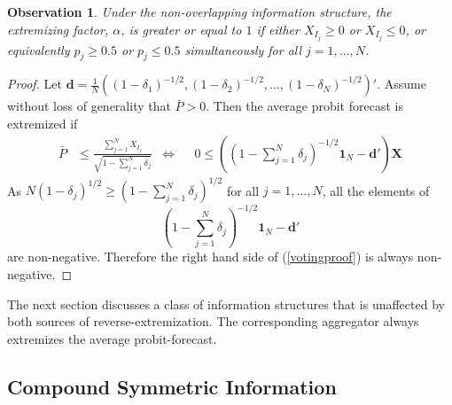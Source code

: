 \documentclass[11pt,twoside]{article}
\newtheorem{observation}[theorem]{Observation}
\theoremstyle{definition}
\theoremstyle{definition}
\begin{document}
\begin{observation}
\label{positiveThmVote}
Under the non-overlapping information structure, the extremizing factor, $\alpha$, is greater or equal to $1$ if either $X_{I_j} \geq 0$ or  $X_{I_j} \leq 0$, or equivalently $p_j \geq 0.5$ or $p_j \leq 0.5$ simultaneously for all $j = 1, \dots, N$. 
\end{observation}
\begin{proof} 
Let $\boldsymbol{d} = \frac{1}{N}\left((1-\delta_1)^{-1/2}, (1-\delta_2)^{-1/2}, \dots, (1-\delta_N)^{-1/2}\right)'$. Assume without loss of generality that $\bar{P} > 0$. Then the average probit forecast is extremized if
\begin{align}
 \bar{P}&\leq  \frac{\sum_{j=1}^N X_{I_j}}{\sqrt{1 - \sum_{j=1}^N \delta_j}} &\Leftrightarrow&& 0 \leq  \left(  \left(1 - \sum_{j=1}^N \delta_j \right)^{-1/2} \boldsymbol{1}_N - \boldsymbol{d}' \right) \boldsymbol{X} \label{votingproof}
\end{align}
 As $N (1-\delta_j)^{1/2} \geq \left(1 - \sum_{j=1}^N \delta_j \right)^{1/2}$ for all $j = 1, \dots, N$, all the elements of $$\left(1 - \sum_{j=1}^N \delta_j \right)^{-1/2} \boldsymbol{1}_N - \boldsymbol{d}' $$ are non-negative. Therefore the right hand side of (\ref{votingproof}) is always non-negative. 
\end{proof}
The next section discusses a class of information structures that is unaffected by both sources of reverse-extremization. The corresponding aggregator always extremizes the average probit-forecast. 

\subsection{Compound Symmetric Information}
\label{compound}
\end{document}
